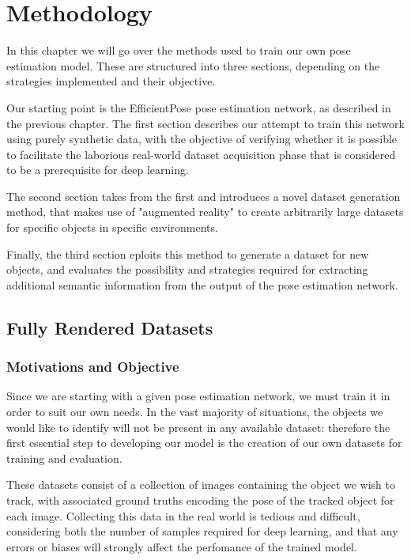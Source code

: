 \chapter{Methodology}

In this chapter we will go over the methods used to train our own pose estimation model. These are structured into three sections, depending on the strategies implemented and their objective.

Our starting point is the EfficientPose pose estimation network, as described in the previous chapter. The first section describes our attempt to train this network using purely synthetic data, with the objective of verifying whether it is possible to facilitate the laborious real-world dataset acquisition phase that is considered to be a prerequisite for deep learning.

The second section takes from the first and introduces a novel dataset generation method, that makes use of "augmented reality" to create arbitrarily large datasets for specific objects in specific environments.

Finally, the third section eploits this method to generate a dataset for new objects, and evaluates the possibility and strategies required for extracting additional semantic information from the output of the pose estimation network.

\section{Fully Rendered Datasets}

\subsection{Motivations and Objective}

Since we are starting with a given pose estimation network, we must train it in order to suit our own needs. In the vast majority of situations, the objects we would like to identify will not be present in any available dataset: therefore the first essential step to developing our model is the creation of our own datasets for training and evaluation.

These datasets consist of a collection of images containing the object we wish to track, with associated ground truths encoding the pose of the tracked object for each image. Collecting this data in the real world is tedious and difficult, considering both the number of samples required for deep learning, and that any errors or biases will strongly affect the perfomance of the trained model.

